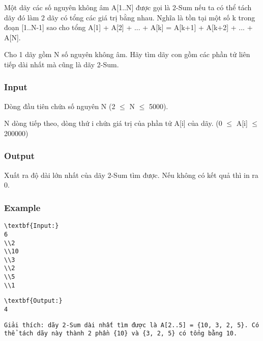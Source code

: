 



   Một dãy các số nguyên không âm A[1..N] được gọi là 2-Sum nếu ta có thể tách dãy đó làm 2 dãy có tổng các giá trị bằng nhau. Nghĩa là tồn tại một số k trong đoạn [1..N-1] sao cho tổng A[1] + A[2] + ... + A[k] = A[k+1] + A[k+2] + ... + A[N].  

   Cho 1 dãy gồm N số nguyên không âm. Hãy tìm dãy con gồm các phần tử liên tiếp dài nhất mà cũng là dãy 2-Sum.  

\subsubsection{   Input  }

   Dòng đầu tiên chứa số nguyên N (2  $\le$  N  $\le$  5000).  

   N dòng tiếp theo, dòng thứ i chứa giá trị của phần tử A[i] của dãy. (0  $\le$  A[i]  $\le$  200000)  

\subsubsection{   Output  }

   Xuất ra độ dài lớn nhất của dãy 2-Sum tìm được. Nếu không có kết quả thì in ra 0.  

\subsubsection{   Example  }
\begin{verbatim}
\textbf{Input:}
6
\\2
\\10
\\3
\\2
\\5
\\1 \end{verbatim}
\begin{verbatim}
\textbf{Output:}
4\end{verbatim}
\begin{verbatim}
Giải thích: dãy 2-Sum dài nhất tìm được là A[2..5] = {10, 3, 2, 5}. Có thể tách dãy này thành 2 phần {10} và {3, 2, 5} có tổng bằng 10.\end{verbatim}

